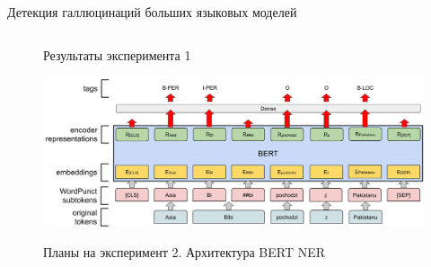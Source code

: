 \documentclass[8pt,pdf,hyperref={unicode}]{beamer}
\begin{document}
\begin{frame}{Детекция галлюцинаций больших языковых моделей}
\begin{columns}
\begin{column}{0.6\textwidth}
\begin{figure}
        \caption{Результаты эксперимента 1}
    \end{figure}
    \begin{figure}
        \centering
        \includegraphics[width=1\linewidth]{Screenshot 2024-10-11 095750.png}
        \label{hist}
        \caption{Планы на эксперимент 2. Архитектура BERT NER}
    \end{figure}
\end{column}
\end{columns}


\end{frame}
\end{document}
